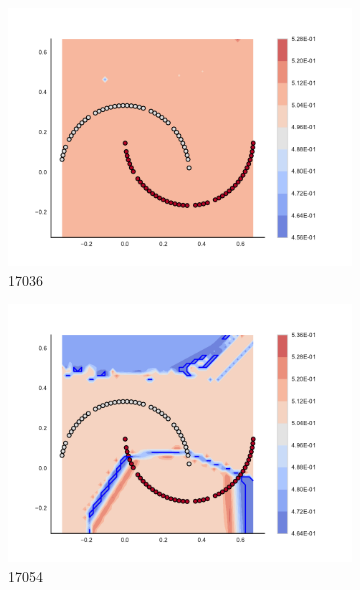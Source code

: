\begin{figure}[h]
\begin{subfigure}[b]{0.09\textwidth}
    \includegraphics[clip, trim=2.35cm 1.75cm 4.5cm 0cm,width=\textwidth]{img/convergence/17036.pdf}
    \caption{17036}
    \label{fig:convergence_17036}
\end{subfigure}
%
\begin{subfigure}[b]{0.09\textwidth}
    \includegraphics[clip, trim=2.35cm 1.75cm 4.5cm 0cm,width=\textwidth]{img/convergence/17054.pdf}
    \caption{17054}
    \label{fig:convergence_17054}
\end{subfigure}
%
\begin{subfigure}[b]{0.09\textwidth}

\end{subfigure}
\end{figure}
